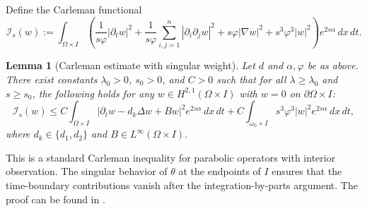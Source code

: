 \documentclass[12pt]{amsart}
\theoremstyle{plain}
\newtheorem{lemma}{Lemma}[section]
\theoremstyle{definition}
\theoremstyle{remark}
\newcommand{\p}{\partial}
\newcommand{\Om}{\Omega}
\begin{document}
Define the Carleman functional
\[
\mathcal I_s(w):=\int_{\Omega\times I}\left(\frac{1}{s\varphi}|\partial_t w|^2
+\frac{1}{s\varphi}\sum_{i,j=1}^n|\p_i\p_j w|^2
+s\varphi|\nabla w|^2+s^3\varphi^3|w|^2\right)e^{2s\alpha}\,dx\,dt.
\]

\begin{lemma}[Carleman estimate with singular weight]\label{lem:carleman}
Let $d$ and $\alpha,\varphi$ be as above.
There exist constants $\lambda_0>0$, $s_0>0$, and $C>0$ such that for all
$\lambda\ge\lambda_0$ and $s\ge s_0$, the following holds for any
$w\in H^{2,1}(\Omega\times I)$ with $w=0$ on $\partial\Omega\times I$:
\begin{equation}\label{eq:carleman-scalar}
\mathcal I_s(w)\le
C\int_{\Omega\times I}
\bigl|\partial_t w-d_k\Delta w + B w\bigr|^2 e^{2s\alpha}\,dx\,dt
+C\int_{\omega_0\times I} s^3\varphi^3 |w|^2 e^{2s\alpha}\,dx\,dt,
\end{equation}
where $d_k\in\{d_1,d_2\}$ and $B\in L^\infty(\Om\times I)$.
\end{lemma}

This is a standard Carleman inequality for parabolic operators with interior observation. The singular behavior of $\theta$ at the endpoints of $I$ ensures that the time-boundary contributions vanish after the integration-by-parts argument.
The proof can be found in \cite{fursikov1996controllability, Ima1}.
\end{document}
